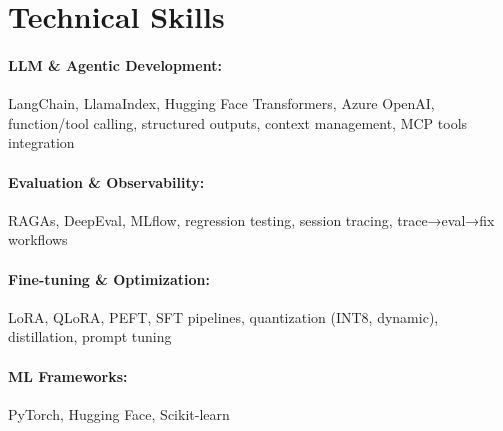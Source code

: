 \documentclass[10pt, letterpaper]{article}
\newenvironment{onecolentry}{
    \begin{adjustwidth}{
        0 cm + 0.00001 cm
    }{
        0 cm + 0.00001 cm
    }
}{
    \end{adjustwidth}
} %
\begin{document}
        




\vspace{-1mm}
\section{Technical Skills}

        \paragraph{LLM \& Agentic Development:} LangChain, LlamaIndex, Hugging Face Transformers, Azure OpenAI, function/tool calling, structured outputs, context management, MCP tools integration
        \vspace{-4mm}
        \paragraph{Evaluation \& Observability:} RAGAs, DeepEval, MLflow, regression testing, session tracing, trace→eval→fix workflows
        \vspace{-4mm}
        \paragraph{Fine-tuning \& Optimization:} LoRA, QLoRA, PEFT, SFT pipelines, quantization (INT8, dynamic), distillation, prompt tuning
        \vspace{-4mm}
        \paragraph{ML Frameworks:} PyTorch, Hugging Face, Scikit-learn
        \vspace{-4mm}
\end{document}
